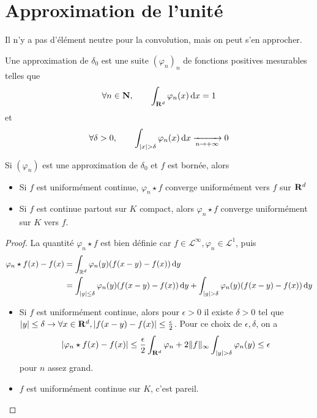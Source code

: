 \section{Approximation de l'unité}

Il n'y a pas d'élément neutre pour la convolution, mais on peut s'en approcher.

\begin{dfn}
    Une approximation de $\delta_0$ est une suite  $(\varphi_n)_n$ de fonctions positives mesurables telles que \[ \forall  n \in  \mathbf N, \qquad  \int_{\mathbf R^d}\varphi_n(x)\mathop{}\!\mathrm d x=1\] et \[\forall \delta>0, \qquad  \int_{|x|>\delta }\varphi_n(x)\diff x \xrightarrow[n\to+\infty]{}0\]
\end{dfn}

\begin{thm}
    Si $(\varphi_n)$ est une approximation de $\delta_0$ et $f$ est bornée, alors \begin{itemize}
        \item Si $f$ est uniformément continue,  $\varphi_n\star f$ converge uniformément vers  $f$ sur  $\mathbf R^d$
            \item Si $f$ est continue partout sur  $K$ compact, alors  $\varphi_n\star f$ converge uniformément sur  $K $ vers $f$.
    \end{itemize}
\end{thm}

\begin{proof}
La quantité $\varphi_n\star f$ est bien définie car $f \in  \mathcal L^\infty, \varphi_n \in  \mathcal L^1$, puis \begin{align*}
\varphi_n\star f(x)-f(x)&= \int_{\mathbb{R}^d}\varphi_n(y)(f(x-y)-f(x))\diff y\\
& = \int_{|y|\leq \delta} \varphi_n(y) (f(x-y)-f(x))\diff y + \int_{|y|>\delta}\varphi_n(y)(f(x-y)-f(x))\diff y\\
\end{align*}
\begin{itemize}
    \item Si $f$ est uniformément continue, alors pour  $ \epsilon>0$ il existe $\delta>0$ tel que  $|y|\leq \delta \to \forall x \in  \mathbf R^d, |f(x-y)-f(x)|\leq \frac\epsilon2$. Pour ce choix de $\epsilon, \delta$, on a \[|\varphi_n\star f(x)-f(x)|\leq \frac\epsilon2\int_{\R^d}\varphi_n+2\|f\|_\infty\int_{|y|>\delta}\varphi_n(y)\leq \epsilon\] pour $n$ assez grand. 
        \item $f$ est uniformément continue sur  $K$, c'est pareil.
\end{itemize}
\end{proof}

